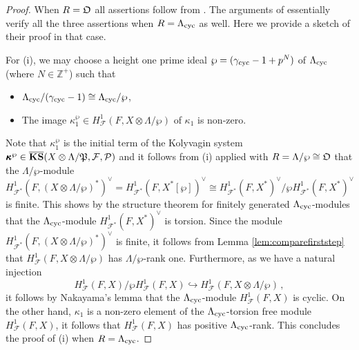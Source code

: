 \documentclass[12pt]{amsart}
\numberwithin{equation}{section}
\begin{document}
\begin{proof}
When $R={\frak{O}}$ all assertions follow from \cite[\S5.2]{mr02}. The arguments of \cite[\S5.3]{mr02} essentially verify all the three assertions when $R={\Lambda}_{\textup{cyc}}$ as well. Here we provide a sketch of their proof in that case.

For (i), we may choose a height one prime ideal $\wp=(\gamma_{\textup{cyc}}-1+p^N)$ of ${\Lambda}_{\textup{cyc}}$ (where $N \in {\mathbb{Z}}^+$) such that
\begin{itemize}
\item ${\Lambda}_{\textup{cyc}}/(\gamma_{\textup{cyc}}-1)\cong {\Lambda}_{\textup{cyc}}/\wp$, 
\item The image $\kappa_1^\wp\in H^1_{\mathcal{F}}(F,X\otimes{\Lambda}/\wp)$ of $\kappa_1$ is non-zero. 
\end{itemize} 
Note that $\kappa_1^\wp$ is the initial term of the Kolyvagin system $\pmb{\kappa}^\wp \in \overline{\mathbf{KS}}(X\otimes{\Lambda}/\frak{P},{\mathcal{F}},{\mathcal{P}})$ and it follows from (i) applied with $R={\Lambda}/\wp\cong {\frak{O}}$ that the ${\Lambda}/\wp$-module 
$$H^1_{{\mathcal{F}}^*}\left(F,\left(X\otimes{\Lambda}/\wp\right)^*\right)^\vee=H^1_{{\mathcal{F}}^*}\left(F,X^*[\wp]\right)^\vee\cong H^1_{{\mathcal{F}}^*}\left(F,X^*\right)^\vee/\wp H^1_{{\mathcal{F}}^*}\left(F,X^*\right)^\vee$$
is finite. This shows by the structure theorem for finitely generated ${\Lambda}_{\textup{cyc}}$-modules that the ${\Lambda}_{\textup{cyc}}$-module $H^1_{{\mathcal{F}}^*}\left(F,X^*\right)^\vee$ is torsion. Since the module $H^1_{{\mathcal{F}}^*}\left(F,\left(X\otimes{\Lambda}/\wp\right)^*\right)^\vee$ is finite, it follows from Lemma \ref{lem:comparefirststep} that $H^1_{\mathcal{F}}\left(F,X\otimes{\Lambda}/\wp\right)$ has ${\Lambda}/\wp$-rank one. Furthermore, as we have a natural injection 
$$H^1_{\mathcal{F}}\left(F,X\right)/\wp H^1_{\mathcal{F}}\left(F,X\right)\hookrightarrow H^1_{\mathcal{F}}\left(F,X\otimes{\Lambda}/\wp\right)\,,$$
it follows by Nakayama's lemma that the ${\Lambda}_{\textup{cyc}}$-module $H^1_{\mathcal{F}}\left(F,X\right)$ is cyclic. On the other hand, $\kappa_1$ is a non-zero element of the ${\Lambda}_{\textup{cyc}}$-torsion free module $H^1_{\mathcal{F}}(F,X)$, it follows that $H^1_{\mathcal{F}}(F,X)$ has positive ${\Lambda}_{\textup{cyc}}$-rank. This concludes the proof of (i) when $R={\Lambda}_{\textup{cyc}}$.


\end{proof}
\end{document}
